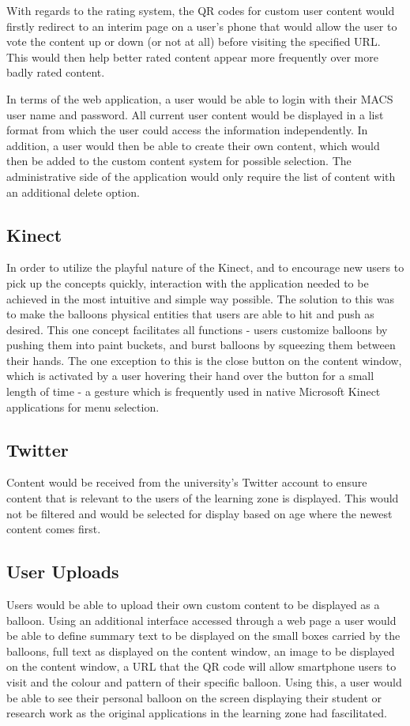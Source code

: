 With regards to the rating system, the QR codes for custom user content would firstly redirect to an interim page on a user's phone that would allow the user to vote the content up or down (or not at all) before visiting the specified URL. This would then help better rated content appear more frequently over more badly rated content.

In terms of the web application, a user would be able to login with their MACS user name and password. All current user content would be displayed in a list format from which the user could access the information independently. In addition, a user would then be able to create their own content, which would then be added to the custom content system for possible selection. The administrative side of the application would only require the list of content with an additional delete option.

\subsection{Kinect}
In order to utilize the playful nature of the Kinect, and to encourage new users to pick up the concepts quickly, interaction with the application needed to be achieved in the most intuitive and simple way possible. The solution to this was to make the balloons physical entities that users are able to hit and push as desired. This one concept facilitates all functions - users customize balloons by pushing them into paint buckets, and burst balloons by squeezing them between their hands. The one exception to this is the close button on the content window, which is activated by a user hovering their hand over the button for a small length of time - a gesture which is frequently used in native Microsoft Kinect applications for menu selection.

\subsection{Twitter}
Content would be received from the university's Twitter account to ensure content that is relevant to the users of the learning zone is displayed. This would not be filtered and would be selected for display based on age where the newest content comes first.

\subsection{User Uploads}
Users would be able to upload their own custom content to be displayed as a balloon. Using an additional interface accessed through a web page a user would be able to define summary text to be displayed on the small boxes carried by the balloons, full text as displayed on the content window, an image to be displayed on the content window, a URL that the QR code will allow smartphone users to visit and the colour and pattern of their specific balloon. Using this, a user would be able to see their personal balloon on the screen displaying their student or research work as the original applications in the learning zone had fascilitated.

